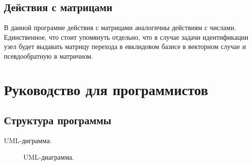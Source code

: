 \documentclass{article}
\numberwithin{equation}{section}
\begin{document}
\subsection{Действия с матрицами}

\qquad В данной программе действия с матрицами аналогичны действиям с числами. Единственное, что стоит упомянуть отдельно, что в случае задачи идентификации узел будет выдавать матрицу перехода в евклидовом базисе в векторном случае и псевдообратную в матричном. 

\newpage

\section{Руководство для программистов}

\subsection{Структура программы}
UML-диграмма:

\begin{figure}[h]
\caption{UML-диаграмма.}
\label{ris:image}
\end{figure}
\end{document}
